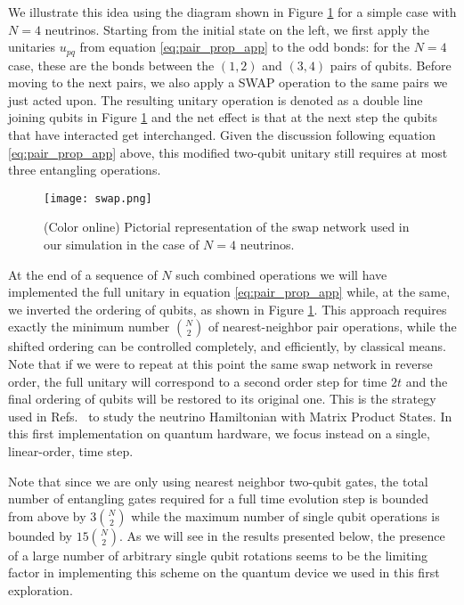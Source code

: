 \documentclass[10pt]{article}
\begin{document}
We illustrate this idea using the diagram shown in Figure \ref{fig:swap_network} for a simple case with $N=4$ neutrinos. Starting from the initial state on the left, we first apply the unitaries $u_{pq}$ from equation \eqref{eq:pair_prop_app} to the odd bonds: for the $N=4$ case, these are the bonds between the $(1,2)$ and $(3,4)$ pairs of qubits. Before moving to the next pairs, we also apply a SWAP operation to the same pairs we just acted upon. The resulting unitary operation is denoted as a double line joining qubits in Figure \ref{fig:swap_network} and the net effect is that at the next step the qubits that have interacted get interchanged. Given the discussion following equation \eqref{eq:pair_prop_app} above, this modified two-qubit unitary still requires at most three entangling operations.

\begin{figure}[h]
 \centering
 \texttt{[image: swap.png]}
 \caption{(Color online) Pictorial representation of the swap network used in our simulation in the case of $N=4$ neutrinos.}
\label{fig:swap_network}
\end{figure}

At the end of a sequence of $N$ such combined operations we will have implemented the full unitary in equation \eqref{eq:pair_prop_app} while, at the same, we inverted the ordering of qubits, as shown in Figure \ref{fig:swap_network}. This approach requires exactly the minimum number $\binom{N}{2}$ of nearest-neighbor pair operations, while the shifted ordering can be controlled completely, and efficiently, by classical means. Note that if we were to repeat at this point the same swap network in reverse order, the full unitary will correspond to a second order step for time $2t$ and the final ordering of qubits will be restored to its original one. This is the strategy used in Refs.~\cite{Roggero2021a,Roggero2021b} to study the neutrino Hamiltonian with Matrix Product States. In this first implementation on quantum hardware, we focus instead on a single, linear-order, time step.

Note that since we are only using nearest neighbor two-qubit gates, the total number of entangling gates required for a full time evolution step is bounded from above by $3\binom{N}{2}$ while the maximum number of single qubit operations is bounded by $15\binom{N}{2}$. As we will see in the results presented below, the presence of a large number of arbitrary single qubit rotations seems to be the limiting factor in implementing this scheme on the quantum device we used in this first exploration.
\end{document}
